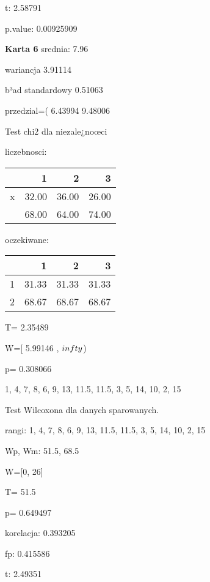 \documentclass[a4paper,12pt]{article}
\begin{document}
\begin{multicols}{3}
     t: 2.58791
     
     p.value: 0.00925909 \vspace{1cm} 

  \textbf{Karta  6 } 
 srednia: 7.96 
     
     wariancja 3.91114  
     
     b³ad standardowy 0.51063 
     
     przedzial=( 6.43994 9.48006 \vspace{1cm} 

  Test chi2 dla niezale¿noœci 
   
   liczebnosci: %
\begin{tabular}{rrrr}
  \hline
 & 1 & 2 & 3 \\
  \hline
x & 32.00 & 36.00 & 26.00 \\
   & 68.00 & 64.00 & 74.00 \\
   \hline
\end{tabular}
 
   
   oczekiwane: %
\begin{tabular}{rrrr}
  \hline
 & 1 & 2 & 3 \\
  \hline
1 & 31.33 & 31.33 & 31.33 \\
  2 & 68.67 & 68.67 & 68.67 \\
   \hline
\end{tabular}
 
   
   T= 2.35489 
   
   W=[ 5.99146 , $\\infty$) 
   
   p= 0.308066 \vspace{1cm} 

  1, 4, 7, 8, 6, 9, 13, 11.5, 11.5, 3, 5, 14, 10, 2, 15 

  Test Wilcoxona dla danych sparowanych. 
  
  rangi: 1, 4, 7, 8, 6, 9, 13, 11.5, 11.5, 3, 5, 14, 10, 2, 15 
  
  Wp, Wm:  51.5,  68.5 
  
  W=[0, 26]  
  
  T=  51.5 
  
  p= 0.649497 \vspace{1cm} 

  korelacja: 0.393205
     
     fp: 0.415586
     
     t: 2.49351
     

\end{multicols}
\end{document}
